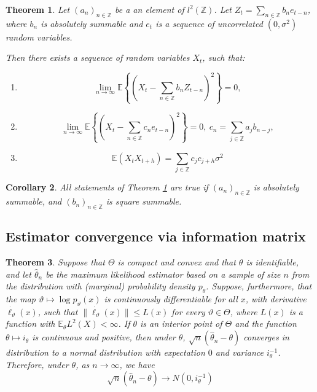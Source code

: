 \documentclass[12pt]{article}
\newtheorem{theorem}{Theorem}[section]
\newtheorem{corollary}[theorem]{Corollary}
\theoremstyle{definition}
\theoremstyle{remark}
\numberwithin{equation}{section}
\newcommand{\ZZ}{\mathbb{Z}}
\newcommand{\EE}{\mathbb{E}}
\begin{document}
\begin{theorem}\label{convl2l1}
	Let $(a_n)_{n\in\ZZ}$ be a an element of $l^2(\ZZ)$. Let $Z_t = \sum_{n\in\ZZ}b_n e_{t-n}$, where $b_n$  is absolutely summable and $e_t$ is a sequence of uncorrelated $(0, \sigma^2)$ random variables.

	Then there exists a sequence of random variables $X_t$, such that:
	\begin{enumerate}
		\item
		\begin{equation*}
			\lim_{n\rightarrow \infty}\EE\left\{\left(X_t - \sum_{n\in\ZZ} b_nZ_{t-n}\right)^2 \right\}= 0,
		\end{equation*}
		\item
		\begin{equation*}
			\lim_{n\rightarrow \infty}\EE\left\{\left(X_t - \sum_{n\in\ZZ} c_ne_{t-n}\right)^2 \right\}= 0,\ c_n = \sum_{j\in\ZZ}a_jb_{n-j},
		\end{equation*}
		\item
		\begin{equation*}
			\EE\left(X_tX_{t+h}\right) = \sum_{j\in\ZZ} c_jc_{j+h}\sigma^2
		\end{equation*}
	\end{enumerate}
\end{theorem}

\begin{corollary}
	All statements of Theorem \ref{convl2l1} are true if $(a_n)_{n\in\ZZ}$ is absolutely summable, and $(b_n)_{n\in\ZZ}$ is square summable.
\end{corollary}

\subsection{Estimator convergence via information matrix}
\begin{theorem}
	Suppose that $\Theta$ is compact and convex and that $\theta$ is identifiable, and let $\hat{\theta}_n$ be the maximum likelihood estimator based on a sample of size $n$ from the distribution with (marginal) probability density $p_\theta$. Suppose, furthermore, that the map $\vartheta\mapsto \log p_\vartheta(x)$ is continuously differentiable for all $x$, with derivative $\dot{\ell_\vartheta}(x)$, such that $\|\dot{\ell_\vartheta}(x)\|\leq L(x)$ for every $\vartheta\in\Theta$, where $L(x)$ is a function with $\EE_\theta L^2(X)<\infty$.
	If $\theta$ is an interior point of $\Theta$ and the function $\theta\mapsto i_\theta$ is continuous and positive, then under $\theta$, $\sqrt{n}(\hat{\theta}_n - \theta)$
	converges in distribution to a normal distribution with expectation $0$ and variance $i^{-1}_\theta$. Therefore, under $\theta$, as $n\rightarrow\infty$, we have
	\begin{equation*}
		\sqrt{n}(\hat{\theta}_n - \theta) \rightarrow N(0, i_\theta^{-1})
	\end{equation*}
\end{theorem}
\end{document}
